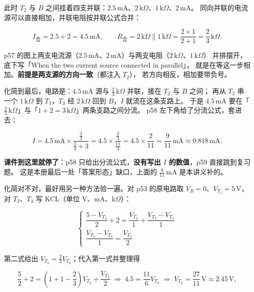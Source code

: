 \documentclass[11pt]{ctexart}
\begin{document}
此时 $T_2$ 与 $B$ 之间挂着四支并联：$2.5\,\mathrm{mA}$、$2\,\mathrm{k}\Omega$、$1\,\mathrm{k}\Omega$、$2\,\mathrm{mA}$。
同向并联的电流源可以直接相加，并联电阻按并联公式合并：

\[ I_{\text{合}} = 2.5+2 = 4.5\,\mathrm{mA}, \qquad
   R_{\text{合}} = 2\,\mathrm{k}\Omega \parallel 1\,\mathrm{k}\Omega
   = \frac{2\times1}{2+1} = \frac{2}{3}\,\mathrm{k}\Omega . \]

p57 的图上两支电流源（$2.5\,\mathrm{mA}$、$2\,\mathrm{mA}$）与两支电阻（$2\,\mathrm{k}\Omega$、$1\,\mathrm{k}\Omega$）
并排摆开，底下写「When the two current source connected in parallel」，
就是在等这一步相加。\textbf{前提是两支源的方向一致}（都注入 $T_2$），
若方向相反，相加要带负号。


化简到最后，电路是：$4.5\,\mathrm{mA}$ 源与 $\frac{2}{3}\,\mathrm{k}\Omega$ 并联，接在 $T_2$ 与 $B$ 之间；
再从 $T_2$ 串一个 $1\,\mathrm{k}\Omega$ 到 $T_3$，$T_3$ 经 $2\,\mathrm{k}\Omega$ 回到 $B$，$I$ 就流在这条支路上。
于是 $4.5\,\mathrm{mA}$ 要在「$\frac{2}{3}\,\mathrm{k}\Omega$」与「$1+2=3\,\mathrm{k}\Omega$」两条支路之间分流。
p58 左下角给了分流公式，套进去：

\[ I = 4.5\,\mathrm{mA}\times
   \frac{\frac{2}{3}}{\frac{2}{3}+3}
   = 4.5\times\frac{\frac{2}{3}}{\frac{11}{3}}
   = 4.5\times\frac{2}{11}
   = \frac{9}{11}\,\mathrm{mA} \approx 0.818\,\mathrm{mA} . \]

\textbf{课件到这里就停了}：p58 只给出分流公式，\textbf{没有写出 $I$ 的数值}，p59 直接跳到复习题。
这是本册最后一处「答案形态」缺口，上面的 $\frac{9}{11}\,\mathrm{mA}$ 是本讲义补的。


化简对不对，最好用另一种方法验一遍。对 p53 的原电路取 $V_B=0$、$V_{T_1}=5\,\mathrm{V}$，
对 $T_2$、$T_3$ 写 KCL（单位 V、mA、k$\Omega$）：

\[
\begin{cases}
\dfrac{5-V_{T_2}}{2} + 2 = \dfrac{V_{T_2}}{1} + \dfrac{V_{T_2}-V_{T_3}}{1} \\[8pt]
\dfrac{V_{T_2}-V_{T_3}}{1} = \dfrac{V_{T_3}}{2}
\end{cases}
\]

第二式给出 $V_{T_3} = \frac{2}{3}V_{T_2}$；代入第一式并整理得

\[ \frac{5}{2}+2 = \left(1+1-\frac{2}{3}\right)V_{T_2}+\frac{V_{T_2}}{2}
   \;\Longrightarrow\; 4.5 = \frac{11}{6}V_{T_2}
   \;\Longrightarrow\; V_{T_2} = \frac{27}{11}\,\mathrm{V} \approx 2.45\,\mathrm{V}, \]
\end{document}
